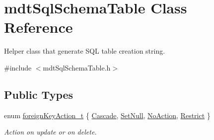\hypertarget{classmdt_sql_schema_table}{\section{mdt\-Sql\-Schema\-Table Class Reference}
\label{classmdt_sql_schema_table}
}


Helper class that generate S\-Q\-L table creation string.  




{\ttfamily \#include $<$mdt\-Sql\-Schema\-Table.\-h$>$}

\subsection*{Public Types}
\begin{DoxyCompactItemize}
\item 
enum \hyperlink{classmdt_sql_schema_table_a1738e443f03dc69b914edb967cb911be}{foreign\-Key\-Action\-\_\-t} \{ \hyperlink{classmdt_sql_schema_table_a1738e443f03dc69b914edb967cb911bea69dd241f7f53962080a7f2ba14a8a203}{Cascade}, 
\hyperlink{classmdt_sql_schema_table_a1738e443f03dc69b914edb967cb911bea1c16892bf8fa377f987abbb4d1c5644a}{Set\-Null}, 
\hyperlink{classmdt_sql_schema_table_a1738e443f03dc69b914edb967cb911bea88f6f3c8088eba177e18cb26f518d61d}{No\-Action}, 
\hyperlink{classmdt_sql_schema_table_a1738e443f03dc69b914edb967cb911bea63478da446745c0346acfc6f5665abfe}{Restrict}
 \}
\begin{DoxyCompactList}\small\item\em Action on update or on delete. \end{DoxyCompactList}\end{DoxyCompactItemize}
